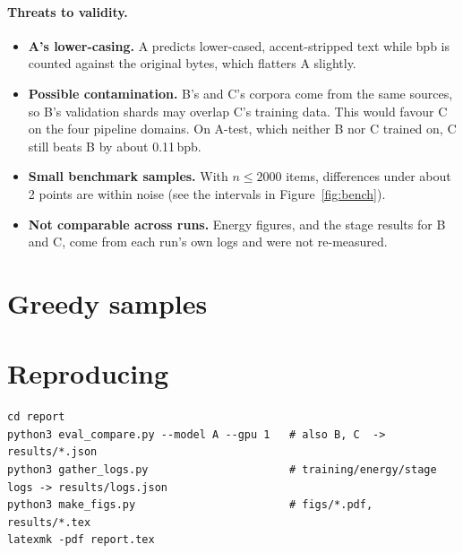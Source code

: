 \documentclass[10pt,a4paper]{article}
\begin{document}
\paragraph{Threats to validity.}
\begin{itemize}
  \item \textbf{A's lower-casing.} A predicts lower-cased, accent-stripped text while bpb is counted against the original bytes, which flatters A slightly.
  \item \textbf{Possible contamination.} B's and C's corpora come from the same sources, so B's validation shards may overlap C's training data. This would favour C on the four pipeline domains. On A-test, which neither B nor C trained on, C still beats B by about 0.11\,bpb.
  \item \textbf{Small benchmark samples.} With $n\le2000$ items, differences under about 2 points are within noise (see the intervals in Figure~\ref{fig:bench}).
  \item \textbf{Not comparable across runs.} Energy figures, and the stage results for B and C, come from each run's own logs and were not re-measured.
\end{itemize}

\FloatBarrier
\appendix
\section{Greedy samples}
{\small

}

\section{Reproducing}
\begin{verbatim}
cd report
python3 eval_compare.py --model A --gpu 1   # also B, C  -> results/*.json
python3 gather_logs.py                      # training/energy/stage logs -> results/logs.json
python3 make_figs.py                        # figs/*.pdf, results/*.tex
latexmk -pdf report.tex
\end{verbatim}
\end{document}
